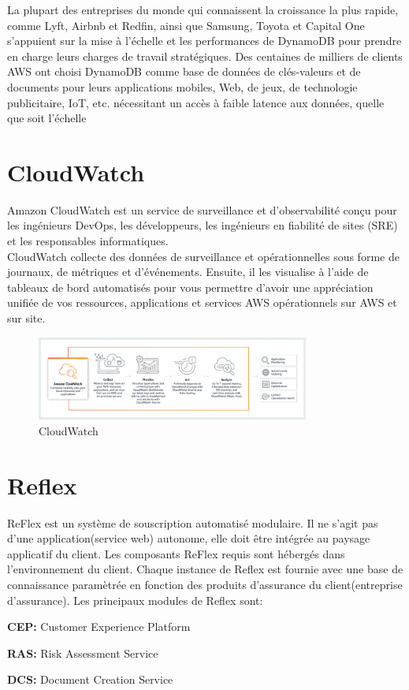 La plupart des entreprises du monde qui connaissent la croissance la plus rapide, comme Lyft, Airbnb et
Redfin, ainsi que Samsung, Toyota et Capital One s’appuient sur la mise à l’échelle et les performances de
DynamoDB pour prendre en charge leurs charges de travail stratégiques.
Des centaines de milliers de clients AWS ont choisi DynamoDB comme base de données de clés-valeurs et
de documents pour leurs applications mobiles, Web, de jeux, de technologie publicitaire, IoT, etc. nécessitant un accès à faible latence aux données, quelle que soit l’échelle
\newpage
\section{CloudWatch}
Amazon CloudWatch est un service de surveillance et d'observabilité conçu pour les ingénieurs DevOps, les développeurs, les ingénieurs en fiabilité de sites (SRE) et les responsables informatiques. \\

CloudWatch collecte des données de surveillance et opérationnelles sous forme de journaux, de métriques et d'événements. Ensuite, il les visualise à l'aide de tableaux de bord automatisés pour vous permettre d’avoir une appréciation unifiée de vos ressources, applications et services AWS opérationnels sur AWS et sur site.
 \begin{figure}[H]
            \centering
                \includegraphics[width=0.8\textwidth]{Figures/cloudwatch}
	       \decoRule
		\caption[CloudWatch]{CloudWatch}
	\label{fig:CloudWatch}
	\end{figure}
\newpage
\section{Reflex}
ReFlex est un système de souscription automatisé modulaire. Il ne s'agit pas d'une application(service web) autonome, elle doit  être intégrée au paysage applicatif du client. Les composants ReFlex requis sont hébergés dans l'environnement du client. Chaque instance de Reflex est fournie avec une base de connaissance paramètrée en fonction des produits d'assurance du client(entreprise d'assurance).
Les principaux modules de Reflex sont:
\begin{list}{•}
\item \textbf{CEP:} Customer Experience Platform
\item
\item \textbf{RAS:} Risk Assessment Service
\item \textbf{DCS:} Document Creation Service 
\end{list}
